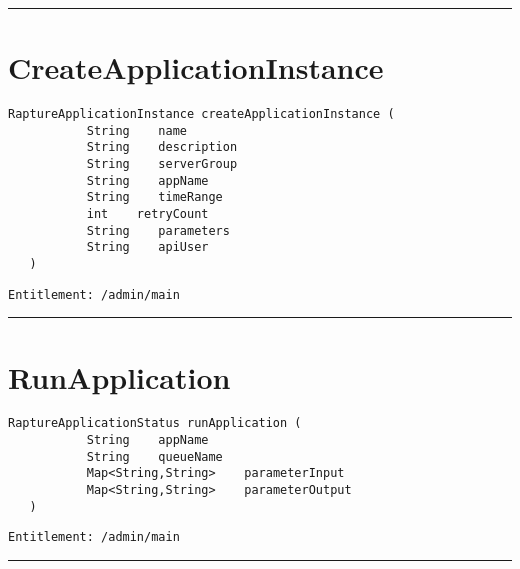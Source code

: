 \rule{12cm}{2pt}
\section{CreateApplicationInstance}
\label{Api:CreateApplicationInstance}
\begin{lstlisting}[style=nonumbers]
   RaptureApplicationInstance createApplicationInstance (
           String    name
           String    description
           String    serverGroup
           String    appName
           String    timeRange
           int    retryCount
           String    parameters
           String    apiUser
   )
\end{lstlisting}
\begin{Verbatim}[formatcom=\color{Maroon}]
  Entitlement: /admin/main
\end{Verbatim}



\rule{12cm}{2pt}
\section{RunApplication}
\label{Api:RunApplication}
\begin{lstlisting}[style=nonumbers]
   RaptureApplicationStatus runApplication (
           String    appName
           String    queueName
           Map<String,String>    parameterInput
           Map<String,String>    parameterOutput
   )
\end{lstlisting}
\begin{Verbatim}[formatcom=\color{Maroon}]
  Entitlement: /admin/main
\end{Verbatim}



\rule{12cm}{2pt}
